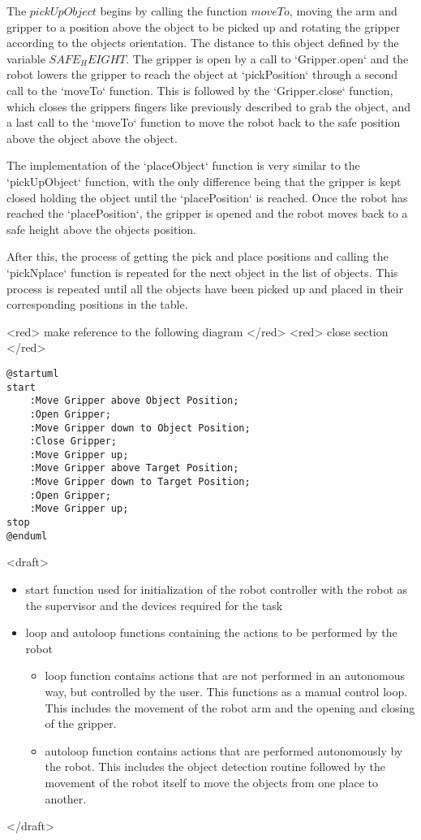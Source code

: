 The \(pickUpObject\) begins by calling the function \(moveTo\), moving the arm and gripper to a position above the object to be picked up and rotating the gripper according to the objects orientation. The distance to this object defined by the variable \(SAFE_HEIGHT\).
The gripper is open by a call to `Gripper.open` and the robot lowers the gripper to reach the object at `pickPosition` through a second call to the `moveTo` function.
This is followed by the `Gripper.close` function, which closes the grippers fingers like previously described to grab the object, and a last call to the `moveTo` function to move the robot back to the safe position above the object above the object.

The implementation of the `placeObject` function is very similar to the `pickUpObject` function, with the only difference being that the gripper is kept closed holding the object until the `placePosition` is reached. Once the robot has reached the `placePosition`, the gripper is opened and the robot moves back to a safe height above the objects position.

After this, the process of getting the pick and place positions and calling the `pickNplace` function is repeated for the next object in the list of objects. This process is repeated until all the objects have been picked up and placed in their corresponding positions in the table.

<red> make reference to the following diagram </red>
<red> close section </red>

\begin{lstlisting}[]%language=plantuml
@startuml
start
    :Move Gripper above Object Position;
    :Open Gripper;
    :Move Gripper down to Object Position;
    :Close Gripper;
    :Move Gripper up;
    :Move Gripper above Target Position;
    :Move Gripper down to Target Position;
    :Open Gripper;
    :Move Gripper up;
stop
@enduml
\end{lstlisting}

<draft>

\begin{itemize}
    \item start function used for initialization of the robot controller with the robot as the supervisor and the devices required for the task
    \item loop and autoloop functions containing the actions to be performed by the robot
    \begin{itemize}
      \item loop function contains actions that are not performed in an autonomous way, but controlled by the user. This functions as a manual control loop. This includes the movement of the robot arm and the opening and closing of the gripper. 
      \item autoloop function contains actions that are performed autonomously by the robot. This includes the object detection routine followed by the movement of the robot itself to move the objects from one place to another.
    \end{itemize}
\end{itemize}
</draft>